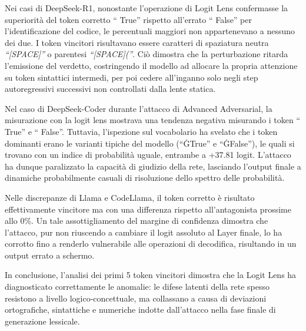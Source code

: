 Nei casi di DeepSeek-R1, nonostante l'operazione di Logit Lens confermasse la superiorità del token corretto \enquote{ True} rispetto all'errato \enquote{ False} per l'identificazione del codice, le percentuali maggiori non appartenevano a nessuno dei due. I token vincitori risultavano essere caratteri di spaziatura neutra \textit{\enquote{[SPACE]}} o parentesi \textit{\enquote{[SPACE](}}. Ciò dimostra che la perturbazione ritarda l'emissione del verdetto, costringendo il modello ad allocare la propria attenzione su token sintattici intermedi, per poi cedere all'inganno solo negli step autoregressivi successivi non controllati dalla lente statica.

Nel caso di DeepSeek-Coder durante l'attacco di Advanced Adversarial, la misurazione con la logit lens mostrava una tendenza negativa misurando i token \enquote{ True} e \enquote{ False}. Tuttavia, l'ispezione sul vocabolario ha svelato che i token dominanti erano le varianti tipiche del modello (\enquote{ĠTrue} e \enquote{ĠFalse}), le quali si trovano con un indice di probabilità uguale, entrambe a +37.81 logit. L'attacco ha dunque paralizzato la capacità di giudizio della rete, lasciando l'output finale a dinamiche probabilmente casuali di risoluzione dello spettro delle probabilità.

Nelle discrepanze di Llama e CodeLlama, il token corretto è risultato effettivamente vincitore ma con una differenza rispetto all'antagonista prossime allo 0\%. Un tale assottigliamento del margine di confidenza dimostra che l'attacco, pur non riuscendo a cambiare il logit assoluto al Layer finale, lo ha corrotto fino a renderlo vulnerabile alle operazioni di decodifica, risultando in un output errato a schermo.

In conclusione, l'analisi dei primi 5 token vincitori dimostra che la Logit Lens ha diagnosticato correttamente le anomalie: le difese latenti della rete spesso resistono a livello logico-concettuale, ma collassano a causa di deviazioni ortografiche, sintattiche e numeriche indotte dall'attacco nella fase finale di generazione lessicale.